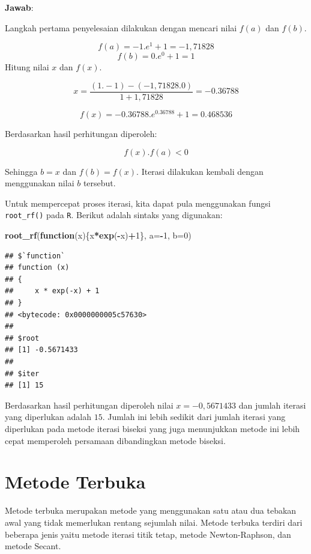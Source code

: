 \documentclass[]{book}
\newenvironment{Shaded}{\begin{snugshade}}{\end{snugshade}}
\newcommand{\ControlFlowTok}[1]{\textcolor[rgb]{0.13,0.29,0.53}{\textbf{#1}}}
\newcommand{\DataTypeTok}[1]{\textcolor[rgb]{0.13,0.29,0.53}{#1}}
\newcommand{\DecValTok}[1]{\textcolor[rgb]{0.00,0.00,0.81}{#1}}
\newcommand{\KeywordTok}[1]{\textcolor[rgb]{0.13,0.29,0.53}{\textbf{#1}}}
\newcommand{\NormalTok}[1]{#1}
\newcommand{\OperatorTok}[1]{\textcolor[rgb]{0.81,0.36,0.00}{\textbf{#1}}}
\theoremstyle{definition}
\theoremstyle{definition}
\theoremstyle{definition}
\theoremstyle{remark}
\begin{document}
\textbf{Jawab}:

Langkah pertama penyelesaian dilakukan dengan mencari nilai \(f\left(a \right)\) dan \(f\left(b \right)\).

\[
f\left(a \right)=-1.e^{1}+1=-1,71828
\]
\[
f\left(b \right)=0.e^{0}+1=1
\]
Hitung nilai \(x\) dan \(f\left(x \right)\).

\[
x=\frac{\left(1.-1\right)-\left(-1,71828.0\right)}{1+1,71828}=-0.36788
\]

\[
f\left(x \right)=-0.36788.e^{0.36788}+1=0.468536
\]

Berdasarkan hasil perhitungan diperoleh:

\[
f\left(x \right).f\left(a \right)<0
\]

Sehingga \(b=x\) dan \(f\left(b \right)=f\left(x \right)\). Iterasi dilakukan kembali dengan menggunakan nilai \(b\) tersebut.

Untuk mempercepat proses iterasi, kita dapat pula menggunakan fungsi \texttt{root\_rf()} pada \texttt{R}. Berikut adalah sintaks yang digunakan:

\begin{Shaded}
\begin{Highlighting}[]
\KeywordTok{root_rf}\NormalTok{(}\ControlFlowTok{function}\NormalTok{(x)\{x}\OperatorTok{*}\KeywordTok{exp}\NormalTok{(}\OperatorTok{-}\NormalTok{x)}\OperatorTok{+}\DecValTok{1}\NormalTok{\},}
               \DataTypeTok{a=}\OperatorTok{-}\DecValTok{1}\NormalTok{, }\DataTypeTok{b=}\DecValTok{0}\NormalTok{)}
\end{Highlighting}
\end{Shaded}

\begin{verbatim}
## $`function`
## function (x) 
## {
##     x * exp(-x) + 1
## }
## <bytecode: 0x0000000005c57630>
## 
## $root
## [1] -0.5671433
## 
## $iter
## [1] 15
\end{verbatim}

Berdasarkan hasil perhitungan diperoleh nilai \(x=-0,5671433\) dan jumlah iterasi yang diperlukan adalah \(15\). Jumlah ini lebih sedikit dari jumlah iterasi yang diperlukan pada metode iterasi biseksi yang juga menunjukkan metode ini lebih cepat memperoleh persamaan dibandingkan metode biseksi.

\hypertarget{openmethod}{%
\section{Metode Terbuka}\label{openmethod}}

Metode terbuka merupakan metode yang menggunakan satu atau dua tebakan awal yang tidak memerlukan rentang sejumlah nilai. Metode terbuka terdiri dari beberapa jenis yaitu metode iterasi titik tetap, metode Newton-Raphson, dan metode Secant.
\end{document}
